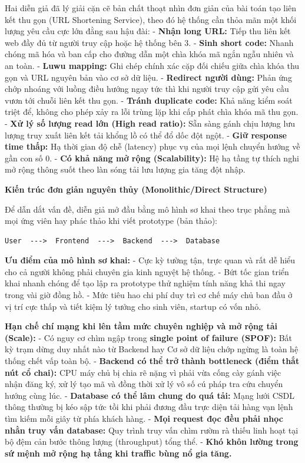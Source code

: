 Hai diễn giả đã lý giải cặn cẽ bản chất thoạt nhìn đơn giản của bài toán
tạo liên kết thu gọn (URL Shortening Service), theo đó hệ thống cần thỏa
mãn một khối lượng yêu cầu cực lớn đằng sau hậu đài: - \textbf{Nhận long
URL:} Tiếp thu liên kết web đầy đủ từ người truy cập hoặc hệ thống bên
3. - \textbf{Sinh short code:} Nhanh chóng mã hóa và ban cấp cho đường
dẫn một chìa khóa mã ngắn ngẫu nhiên và an toàn. - \textbf{Luwu
mapping:} Ghi chép chính xác cặp đối chiếu giữa chìa khóa thu gọn và URL
nguyên bản vào cơ sở dữ liệu. - \textbf{Redirect người dùng:} Phản ứng
chớp nhoáng với luồng điều hướng ngay tức thì khi người truy cập gửi yêu
cầu vươn tới chuỗi liên kết thu gọn. - \textbf{Tránh duplicate code:}
Khả năng kiểm soát triệt để, không cho phép xảy ra lỗi trùng lặp khi cấp
phát chìa khóa mã thu gọn. - \textbf{Xử lý số lượng read lớn (High read
ratio):} Sẵn sàng gánh chịu lượng lưu lượng truy xuất liên kết tải khổng
lồ có thể đổ dốc đột ngột. - \textbf{Giữ response time thấp:} Hạ thời
gian độ chễ (latency) phục vụ của mọi lệnh chuyển hướng về gần con số 0.
- \textbf{Có khả năng mở rộng (Scalability):} Hệ hạ tầng tự thích nghi
mở rộng thông suốt theo làn sóng tải lưu lượng gia tăng đột nhập.

\vspace{0.5em}\noindent\textbf{Kiến trúc đơn giản nguyên thủy (Monolithic/Direct
Structure)}\par

Để dẫn dắt vấn đề, diễn giả mở đầu bằng mô hình sơ khai theo trục phẳng
mà mọi ứng viên hay phác thảo khi viết prototype (bản thảo):

\begin{verbatim}
User  --->  Frontend  --->  Backend  --->  Database
\end{verbatim}

\textbf{Ưu điểm của mô hình sơ khai:} - Cực kỳ tường tận, trực quan và
rất dễ hiểu cho cả người không phải chuyên gia kinh nguyệt hệ thống. -
Bứt tốc gian triển khai nhanh chóng để tạo lập ra prototype thử nghiệm
tính năng khả thi ngay trong vài giờ đồng hồ. - Mức tiêu hao chi phí duy
trì cơ chế máy chủ ban đầu ở vị trí cực thấp và tiết kiệm lý tưởng cho
sinh viên, startup có vốn nhỏ.

\textbf{Hạn chế chí mạng khi lên tầm mức chuyên nghiệp và mở rộng tải
(Scale):} - Có nguy cơ chìm ngập trong \textbf{single point of failure
(SPOF):} Bất kỳ trạm dừng duy nhất nào từ Backend hay Cơ sở dữ liệu chớp
ngừng là toàn hệ thống chết vấp toàn bộ. - \textbf{Backend có thể trở
thành bottleneck (điểm thắt nút cổ chai):} CPU máy chủ bị chia rẽ nặng
vì phải vừa cống cày gánh việc nhận đăng ký, xử lý tạo mã và đồng thời
xử lý vô số cú pháp tra cứu chuyển hướng cùng lúc. - \textbf{Database có
thể lâm chung do quá tải:} Mạng lưới CSDL thông thường bị kéo sập tức
tồi khi phải đương đầu trực diện tải hàng vạn lệnh tìm kiếm mỗi giây từ
phía khách hàng. - \textbf{Mọi request đọc đều phải nhọc nhằn truy vấn
database:} Quy trình truy vấn chìm rườm rà thiếu linh hoạt tại bộ đệm
cản bước thông lượng (throughput) tổng thể. - \textbf{Khó khôn lường
trong sứ mệnh mở rộng hạ tầng khi traffic bùng nổ gia tăng.}

